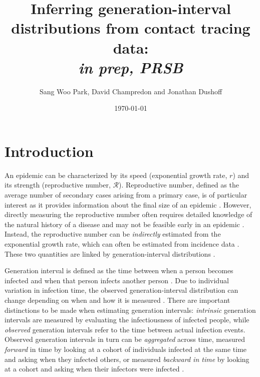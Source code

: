 \documentclass[12pt]{article}
\title{Inferring generation-interval distributions from contact tracing data: \\ \emph{in prep, PRSB}}
\author{Sang Woo Park, David Champredon and Jonathan Dushoff}
\date{\today}
\newcommand{\RR}{\ensuremath{{\mathcal R}}}
\begin{document}
\maketitle

\section{Introduction}


An epidemic can be characterized by its speed (exponential growth rate, $r$) and its strength (reproductive number, \RR).
Reproductive number, defined as the average number of secondary cases arising from a primary case, is of particular interest as it provides information about the final size of an epidemic \citep{anderson1991infectious, diekmann1990definition}.
However, directly measuring the reproductive number often requires detailed knowledge of the natural history of a disease and may not be feasible early in an epidemic \citep{dietz1993estimation}.
Instead, the reproductive number can be \emph{indirectly} estimated from the exponential growth rate, which can often be estimated from incidence data \citep{chowell2003sars, mills2004transmissibility, nishiura2009transmission, nishiura2010pros, ma2014estimating}.
These two quantities are linked by generation-interval distributions \citep{wearing2005appropriate, wallinga2007generation, roberts2007model,  park2019practical}.

Generation interval is defined as the time between when a person becomes infected and when that person infects another person \citep{svensson2007note}.
Due to individual variation in infection time, the observed generation-interval distribution can change depending on when and how it is measured \citep{svensson2007note, kenah2008generation, nishiura2010time, champredon2015intrinsic}.
There are important distinctions to be made when estimating generation intervals: \emph{intrinsic} generation intervals are measured by evaluating the infectiousness of infected people,
while \emph{observed} generation intervals refer to the time between actual infection events.
Observed generation intervals in turn can be \emph{aggregated} across time, measured \emph{forward} in time by looking at a cohort of individuals infected at the same time and asking when they infected others, or measured \emph{backward in time} by looking at a cohort and asking when their infectors were infected \citep{champredon2015intrinsic}.
\end{document}
